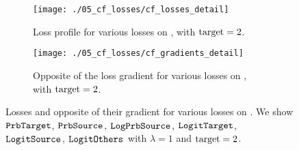 \documentclass[../main.tex]{subfiles}
\begin{document}



\begin{figure}[htbp]
    \centering
    \begin{subfigure}[b]{\textwidth}
        \centering
        \texttt{[image: ./05\_cf\_losses/cf\_losses\_detail]}
        \caption{Loss profile for various losses on \CakeOnSea, with ${\mathrm{target} = 2}$.}
        \label{fig:cf_losses_detail}
    \end{subfigure}

    \vspace*{\floatsep}%

    \begin{subfigure}[b]{\textwidth}
        \centering
        \texttt{[image: ./05\_cf\_losses/cf\_gradients\_detail]}
        \caption{Opposite of the loss gradient for various losses on \CakeOnSea, with ${\mathrm{target} = 2}$.}
        \label{fig:cf_gradients_detail}
    \end{subfigure}

    \caption{Losses and opposite of their gradient for various losses on \CakeOnSea.
    We show $\mathtt{PrbTarget}{}$, $\mathtt{PrbSource}_{}$, $\mathtt{LogPrbSource}_{}$, $\mathtt{LogitTarget}{}$, $\mathtt{LogitSource}_{}$, $\mathtt{LogitOthers}_{}$
     with $\lambda =1$ and $\mathrm{target} = 2$.}
\end{figure}
\end{document}
